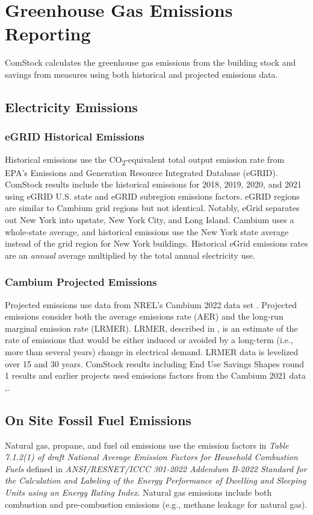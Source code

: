 \section{Greenhouse Gas Emissions Reporting}
ComStock calculates the greenhouse gas emissions from the building stock and savings from measures using both historical and projected emissions data.

\subsection{Electricity Emissions}
\subsubsection{eGRID Historical Emissions}
Historical emissions use the CO\textsubscript{2}-equivalent total output emission rate from EPA's Emissions and Generation Resource Integrated Database (eGRID)\citep{egrid2020}. ComStock results include the historical emissions for 2018, 2019, 2020, and 2021 using eGRID U.S. state and eGRID subregion emissions factors. eGRID regions are similar to Cambium grid regions but not identical. Notably, eGrid separates out New York into upstate, New York City, and Long Island. Cambium uses a whole-state average, and historical emissions use the New York state average instead of the grid region for New York buildings. Historical eGrid emissions rates are an \textit{annual} average multiplied by the total annual electricity use.

\subsubsection{Cambium Projected Emissions}
Projected emissions use data from NREL's Cambium 2022 data set \citep{cambium2022}. Projected emissions consider both the average emissions rate (AER) and the long-run marginal emission rate (LRMER).  LRMER, described in \cite{GAGNON2022103915}, is an estimate of the rate of emissions that would be either induced or avoided by a long-term (i.e., more than several years) change in electrical demand.  LRMER data is levelized over 15 and 30 years\citep{cambium2022}. ComStock results including End Use Savings Shapes round 1 results and earlier projects used emissions factors from the Cambium 2021 data \citep{cambium2021},\citep{lrmer_data2022}.

\subsection{On Site Fossil Fuel Emissions}
Natural gas, propane, and fuel oil emissions use the emission factors in \textit{Table 7.1.2(1) of draft National Average Emission Factors for Household Combustion Fuels} defined in \textit{ANSI/RESNET/ICCC 301-2022 Addendum B-2022 Standard for the Calculation and Labeling of the Energy Performance of Dwelling and Sleeping Units using an Energy Rating Index}. Natural gas emissions include both combustion and pre-combustion emissions (e.g., methane leakage for natural gas).

